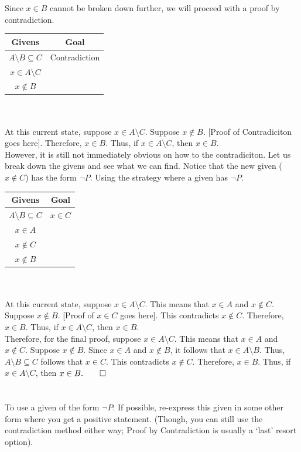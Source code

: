 \documentclass[../setup.tex]{subfiles}
\begin{document}
\phantom \\ \\
Since $x \in B$ cannot be broken down further, we will proceed with a proof by contradiction. \\
\begin{center}
	\begin{tabular}[t]{| c | c |}
		\hline
		Givens  & Goal  \\
		\hline
		$A \setminus B \subseteq C$ & Contradiction \\
		$x \in A \setminus C$ & \\
		$x \notin B$ & \\
		\hline
	\end{tabular}
\end{center}
\phantom \\ \\
At this current state, suppose $x \in A \setminus C$. Suppose $x \notin B$. [Proof of Contradiciton goes here]. Therefore, $x \in B$. Thus, if $x \in A \setminus C$, then $x \in B$. \\
However, it is still not immediately obvious on how to the contradiciton. Let us break down the givens and see what we can find. Notice that the new given ($x \notin C$) has the form $\lnot{P}$. Using the strategy where a given has $\lnot{P}$. \\
\begin{center}
	\begin{tabular}[t]{| c | c |}
		\hline
		Givens  & Goal  \\
		\hline
		$A \setminus B \subseteq C$ & $x \in C$ \\
		$x \in A$ & \\
		$x \notin C$ & \\
		$x \notin B$ & \\
		\hline
	\end{tabular}
\end{center}
\phantom \\ \\
At this current state, suppose $x \in A \setminus C$. This means that $x \in A$ and $x \notin C$. Suppose $x \notin B$. [Proof of $x \in C$ goes here]. This contradicts $x \notin C$. Therefore, $x \in B$. Thus, if $x \in A \setminus C$, then $x \in B$. \\
Therefore, for the final proof,  suppose $x \in A \setminus C$. This means that $x \in A$ and $x \notin C$. Suppose $x \notin B$. Since $x \in A$ and $x \notin B$, it follows that $x \in A \setminus B$. Thus, $A \setminus B \subseteq C$ follows that $x \in C$. This contradicts $x \notin C$. Therefore, $x \in B$. Thus, if $x \in A \setminus C$, then $x \in B. \qed$ \\
\phantom \\ \\
To use a given of the form $\lnot{P}$: If possible, re-express this given in some other form where you get a positive statement. (Though, you can still use the contradiction method either way; Proof by Contradiction is usually a `last' resort option).
\end{document}
